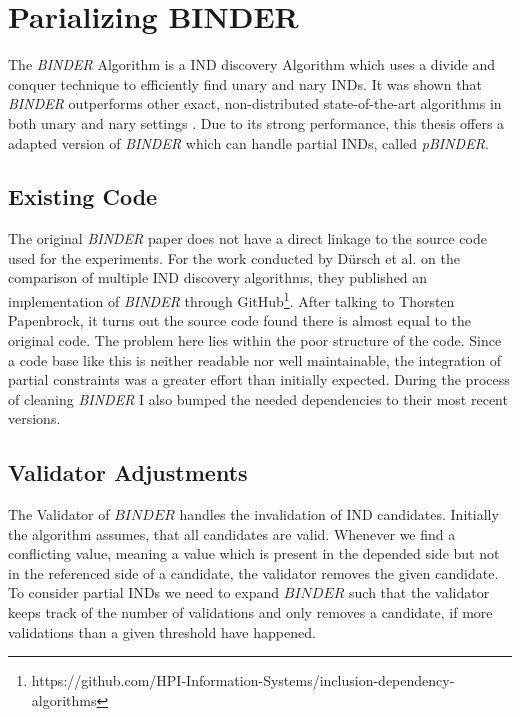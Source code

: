\section{Parializing BINDER}
The \textit{BINDER} Algorithm \cite{papenbrock2015divide} is a IND discovery Algorithm which uses a divide and conquer technique to efficiently find unary and nary INDs. It was shown that \textit{BINDER} outperforms other exact, non-distributed state-of-the-art algorithms in both unary and nary settings \cite{dursch2019inclusion}. Due to its strong performance, this thesis offers a adapted version of \textit{BINDER} which can handle partial INDs, called \textit{pBINDER}.

\subsection{Existing Code}
The original \textit{BINDER} paper does not have a direct linkage to the source code used for the experiments. For the work conducted by Dürsch et al. on the comparison of multiple IND discovery algorithms\cite{dursch2019inclusion}, they published an implementation of \textit{BINDER} through GitHub\footnote{https://github.com/HPI-Information-Systems/inclusion-dependency-algorithms}. After talking to Thorsten Papenbrock, it turns out the source code found there is almost equal to the original code. The problem here lies within the poor structure of the code. Since a code base like this is neither readable nor well maintainable, the integration of partial constraints was a greater effort than initially expected. During the process of cleaning \textit{BINDER} I also bumped the needed dependencies to their most recent versions.

\subsection{Validator Adjustments}
The Validator of $BINDER$ handles the invalidation of IND candidates. Initially the algorithm assumes, that all candidates are valid. Whenever we find a conflicting value, meaning a value which is present in the depended side but not in the referenced side of a candidate, the validator removes the given candidate. To consider partial INDs we need to expand $BINDER$ such that the validator keeps track of the number of validations and only removes a candidate, if more validations than a given threshold have happened.

